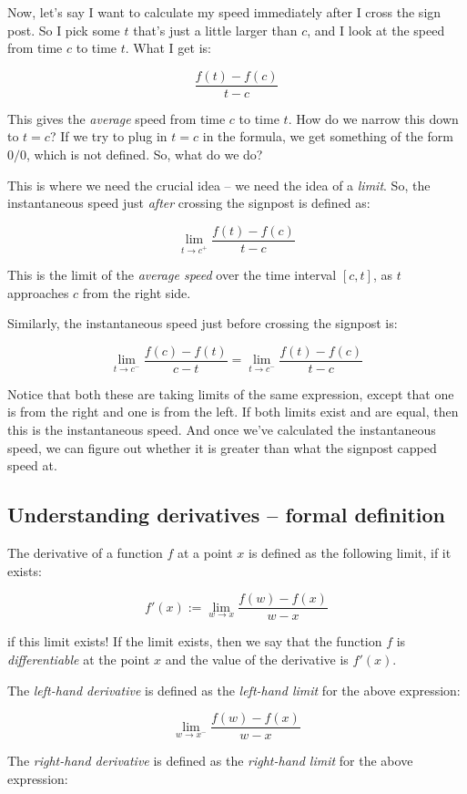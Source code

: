 \documentclass[10pt]{amsart}
\begin{document}
Now, let's say I want to calculate my speed immediately after I cross
the sign post. So I pick some $t$ that's just a little larger than
$c$, and I look at the speed from time $c$ to time $t$. What I get is:

$$\frac{f(t) - f(c)}{t - c}$$

This gives the {\em average} speed from time $c$ to time $t$. How do
we narrow this down to $t = c$? If we try to plug in $t = c$ in the
formula, we get something of the form $0/0$, which is not defined. So,
what do we do?

This is where we need the crucial idea -- we need the idea of a {\em
limit}. So, the instantaneous speed just {\em after} crossing the
signpost is defined as:

$$\lim_{t \to c^+} \frac{f(t) - f(c)}{t - c}$$

This is the limit of the {\em average speed} over the time interval
$[c,t]$, as $t$ approaches $c$ from the right side.

Similarly, the instantaneous speed just before crossing the signpost
is:

$$\lim_{t \to c^-} \frac{f(c) - f(t)}{c - t} = \lim_{t \to c^-} \frac{f(t) - f(c)}{t - c}$$

Notice that both these are taking limits of the same expression,
except that one is from the right and one is from the left. If both
limits exist and are equal, then this is the instantaneous speed. And
once we've calculated the instantaneous speed, we can figure out
whether it is greater than what the signpost capped speed at.

\subsection{Understanding derivatives -- formal definition}

The derivative of a function $f$ at a point $x$ is defined as the
following limit, if it exists:

$$f'(x) := \lim_{w \to x} \frac{f(w) - f(x)}{w - x}$$

if this limit exists! If the limit exists, then we say that the
function $f$ is {\em differentiable} at the point $x$ and the value of the
derivative is $f'(x)$.

The {\em left-hand derivative} is defined as the {\em left-hand limit}
for the above expression:

$$\lim_{w \to x^-} \frac{f(w) - f(x)}{w - x}$$

The {\em right-hand derivative} is defined as the {\em right-hand
limit} for the above expression:
\end{document}
